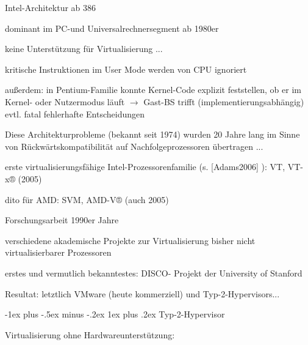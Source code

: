 \documentclass[a4paper]{article}
\makeatletter
\renewcommand{\subsubsection}{\@startsection{subsubsection}{3}{0mm}%
 {-1ex plus -.5ex minus -.2ex}%
 {1ex plus .2ex}%
 {\normalfont\small\bfseries}}
\makeatother
\begin{document}
\begin{multicols}{3}
    Intel-Architektur ab 386

    \begin{itemize*}
        \item
        dominant im PC-und Universalrechnersegment ab 1980er
        \item
        keine Unterstützung für Virtualisierung ...
        \item
        kritische Instruktionen im User Mode werden von CPU ignoriert
        \item
        außerdem: in Pentium-Familie konnte Kernel-Code explizit feststellen,
        ob er im Kernel- oder Nutzermodus läuft $\rightarrow$
        Gast-BS trifft (implementierungsabhängig) evtl. fatal fehlerhafte
        Entscheidungen
        \item
        Diese Architekturprobleme (bekannt seit 1974) wurden 20 Jahre lang im
        Sinne von Rückwärtskompatibilität auf Nachfolgeprozessoren übertragen
        ...
        \begin{itemize*}
            \item erste virtualisierungsfähige Intel-Prozessorenfamilie (s. {[}Adams2006{]} ): VT, VT-x® (2005)
            \item dito für AMD: SVM, AMD-V® (auch 2005)
        \end{itemize*}
    \end{itemize*}

    Forschungsarbeit 1990er Jahre

    \begin{itemize*}
        \item
        verschiedene akademische Projekte zur Virtualisierung bisher nicht
        virtualisierbarer Prozessoren
        \item
        erstes und vermutlich bekanntestes: DISCO- Projekt der University of
        Stanford
        \item
        Resultat: letztlich VMware (heute kommerziell) und
        Typ-2-Hypervisors...
    \end{itemize*}


    \subsubsection{Typ-2-Hypervisor}


    Virtualisierung ohne Hardwareunterstützung:


\end{multicols}
\end{document}
